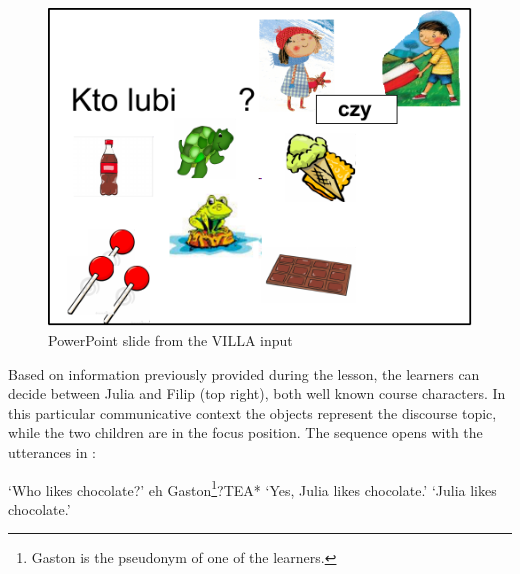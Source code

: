 \begin{figure}
    \includegraphics[width=\textwidth]{figures/08-1.pdf}
    \caption{PowerPoint slide from the VILLA input}
    \label{fig:08:1}
\end{figure}

Based on information previously provided during the lesson, the learners can decide between Julia and Filip (top right), both well known course characters. In this particular communicative context the objects represent the discourse topic, while the two children are in the focus position. The sequence opens with the utterances in :

\ea%
    \label{ex:08:2}
    \glt    ‘Who likes chocolate?’
    \ex\label{ex:08:2b}
    {eh}   {Gaston}\footnote{Gaston is the pseudonym of one of the learners.}?\hfill TEA*
    \glt   ‘Yes, Julia likes chocolate.’
    \glt    ‘Julia likes chocolate.’
    \z
\z

